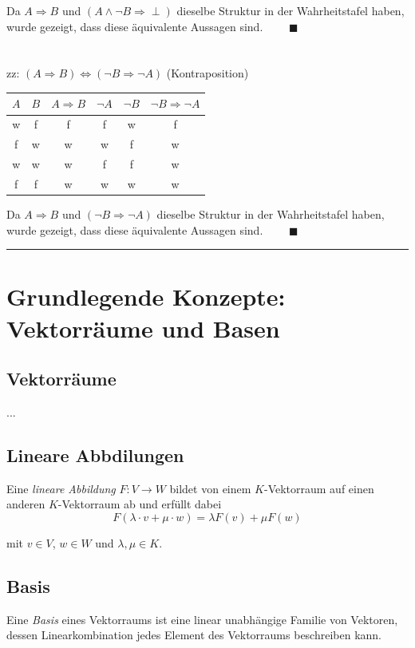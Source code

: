 \documentclass{article}
\begin{document}
{	Da $A \Rightarrow B$ und $(A \wedge \neg B \Rightarrow \perp)$ dieselbe Struktur in der Wahrheitstafel haben, wurde gezeigt, dass diese äquivalente Aussagen sind. $\qquad \blacksquare$\\
	\\
	\\
	zz: $(A \Rightarrow B) \Leftrightarrow (\neg B \Rightarrow \neg A)$ (Kontraposition)
		\begin{table}[h]
			\centering
			\begin{tabular}{c|c||c||c|c|c}
				\hline\hline
					$A$ & $B$ & $A \Rightarrow B$ & $\neg A$ & $\neg B$ & $\neg B \Rightarrow \neg A$ \\
				\hline
					w & f & f & f & w & f \\
					f & w & w & w & f & w \\
					w & w & w & f & f & w \\
					f & f & w & w & w & w \\
				\hline\hline
			\end{tabular}		
		\end{table}
	
	Da $A \Rightarrow B$ und $(\neg B \Rightarrow \neg A)$ dieselbe Struktur in der Wahrheitstafel haben, wurde gezeigt, dass diese äquivalente Aussagen sind. $\qquad \blacksquare$\\
\hrule
}


\newpage


\section{Grundlegende Konzepte: Vektorräume und Basen}
\subsection{Vektorräume}
...

\subsection{Lineare Abbdilungen}
Eine \textit{lineare Abbildung} $F:V\to W$ bildet von einem $K$-Vektorraum auf einen anderen $K$-Vektorraum ab und erfüllt dabei
	\begin{equation}
		F(\lambda\cdot v + \mu \cdot w) = \lambda F(v) + \mu F(w)
	\end{equation}

mit $v\in V$, $w\in W$ und $\lambda,\mu \in K$.


\subsection{Basis}
Eine \textit{Basis} eines Vektorraums ist eine linear unabhängige Familie von Vektoren, dessen Linearkombination jedes Element des Vektorraums beschreiben kann.
\end{document}
